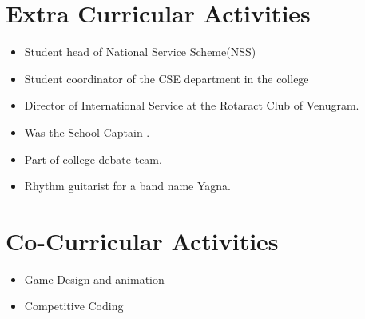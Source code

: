 \documentclass{article}
\begin{document}
		\section{Extra Curricular Activities}
			\begin{itemize}
				\item Student head of National Service Scheme(NSS)
				\item Student coordinator of the CSE department in the college
				\item Director of International Service at the Rotaract Club of Venugram.
				\item Was the School Captain .
				\item Part of college debate team.
				\item Rhythm guitarist for a band name Yagna.
			\end{itemize}
		\section{Co-Curricular Activities}
			\begin{itemize}
				\item Game Design and animation
				\item Competitive Coding 
			\end{itemize}
			
\end{document}
